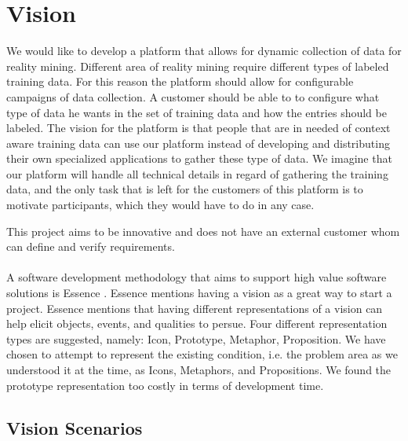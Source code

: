 
\section{Vision}
\label{sec:vision}

We would like to develop a platform that allows for dynamic collection of data for reality mining. Different area of reality mining require different types of labeled training data. For this reason the platform should allow for configurable campaigns of data collection. A customer should be able to to configure what type of data he wants in the set of training data and how the entries should be labeled. The vision for the platform is that people that are in needed of context aware training data can use our platform instead of developing and distributing their own specialized applications to gather these type of data. We imagine that our platform will handle all technical details in regard of gathering the training data, and the only task that is left for the customers of this platform is to motivate participants, which they would have to do in any case.


This project aims to be innovative and does not have an external customer whom can define and verify requirements. 
\\\\
A software development methodology that aims to support high value software solutions is Essence . Essence mentions having a vision as a great way to start a project. Essence mentions that having different representations of a vision can help elicit objects, events, and qualities to persue. Four different representation types are suggested, namely: Icon, Prototype, Metaphor, Proposition. We have chosen to attempt to represent the existing condition, i.e. the problem area as we understood it at the time, as Icons, Metaphors, and Propositions. We found the prototype representation too costly in terms of development time. 

\subsection{Vision Scenarios}
\label{sub:vision_scenarios}

